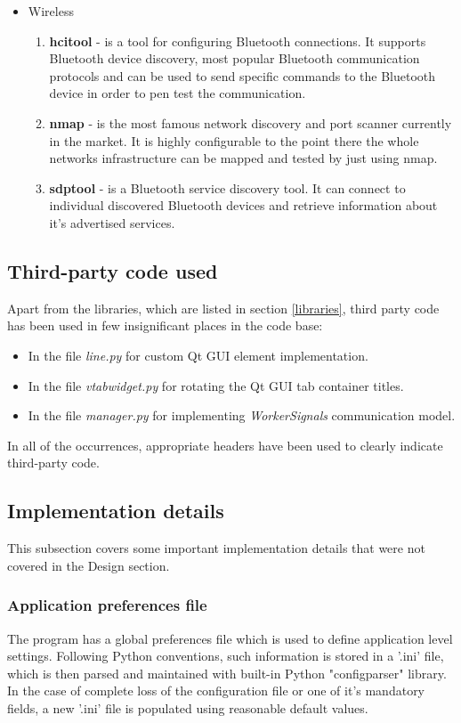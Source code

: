 \begin{itemize}
		\item Wireless
		\begin{enumerate}[resume]
			\item \textbf{hcitool} - is a tool for configuring Bluetooth connections. It supports Bluetooth device discovery, most popular Bluetooth communication protocols and can be used to send specific commands to the Bluetooth device in order to pen test the communication.
			\item \textbf{nmap} - is the most famous network discovery and port scanner currently in the market. It is highly configurable to the point there the whole networks infrastructure can be mapped and tested by just using nmap.
			\item \textbf{sdptool} - is a Bluetooth service discovery tool. It can connect to individual discovered Bluetooth devices and retrieve information about it's advertised services.
		\end{enumerate}
	
	\end{itemize}
		

\subsection{Third-party code used}
	Apart from the libraries, which are listed in section \ref{libraries}, third party code has been used in few insignificant places in the code base:
	\begin{itemize}
		\item In the file \textit{line.py} for custom Qt GUI element implementation.
		\item In the file \textit{vtabwidget.py} for rotating the Qt GUI tab container titles.
		\item In the file \textit{manager.py} for implementing \textit{WorkerSignals} communication model.
	\end{itemize}
	In all of the occurrences, appropriate headers have been used to clearly indicate third-party code.

\subsection{Implementation details}
	This subsection covers some important implementation details that were not covered in the Design section.

	\subsubsection{Application preferences file}
	The program has a global preferences file which is used to define application level settings. Following Python conventions, such information is stored in a '.ini' file, which is then parsed and maintained with built-in Python "configparser" library. In the case of complete loss of the configuration file or one of it's mandatory fields, a new '.ini' file is populated using reasonable default values.
			
